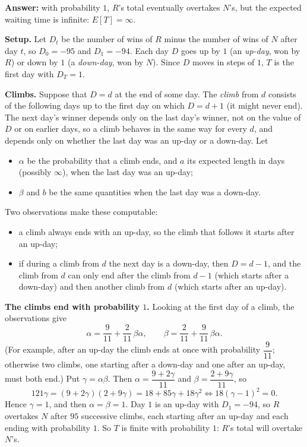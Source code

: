 \textbf{Answer:} with probability $1$, $R$'s total eventually overtakes $N$'s, but the expected waiting time is infinite: $E[T]=\infty$.

\textbf{Setup.} Let $D_t$ be the number of wins of $R$ minus the number of wins of $N$ after day $t$, so $D_0=-95$ and $D_1=-94$. Each day $D$ goes up by $1$ (an \emph{up-day}, won by $R$) or down by $1$ (a \emph{down-day}, won by $N$). Since $D$ moves in steps of $1$, $T$ is the first day with $D_T=1$.

\textbf{Climbs.} Suppose that $D=d$ at the end of some day. The \emph{climb} from $d$ consists of the following days up to the first day on which $D=d+1$ (it might never end). The next day's winner depends only on the last day's winner, not on the value of $D$ or on earlier days, so a climb behaves in the same way for every $d$, and depends only on whether the last day was an up-day or a down-day. Let
\begin{itemize}
\item $\alpha$ be the probability that a climb ends, and $a$ its expected length in days (possibly $\infty$), when the last day was an up-day;
\item $\beta$ and $b$ be the same quantities when the last day was a down-day.
\end{itemize}
Two observations make these computable:
\begin{itemize}
\item a climb always ends with an up-day, so the climb that follows it starts after an up-day;
\item if during a climb from $d$ the next day is a down-day, then $D=d-1$, and the climb from $d$ can only end after the climb from $d-1$ (which starts after a down-day) and then another climb from $d$ (which starts after an up-day).
\end{itemize}

\textbf{The climbs end with probability $1$.} Looking at the first day of a climb, the observations give
\[\alpha=\dfrac{9}{11}+\dfrac{2}{11}\,\beta\alpha,\qquad\beta=\dfrac{2}{11}+\dfrac{9}{11}\,\beta\alpha.\]
(For example, after an up-day the climb ends at once with probability $\dfrac9{11}$; otherwise two climbs, one starting after a down-day and one after an up-day, must both end.) Put $\gamma=\alpha\beta$. Then $\alpha=\dfrac{9+2\gamma}{11}$ and $\beta=\dfrac{2+9\gamma}{11}$, so
\[121\gamma=(9+2\gamma)(2+9\gamma)=18+85\gamma+18\gamma^2\iff18(\gamma-1)^2=0.\]
Hence $\gamma=1$, and then $\alpha=\beta=1$. Day $1$ is an up-day with $D_1=-94$, so $R$ overtakes $N$ after $95$ successive climbs, each starting after an up-day and each ending with probability $1$. So $T$ is finite with probability $1$: $R$'s total will overtake $N$'s.

